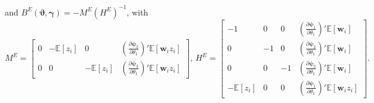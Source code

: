 \begin{lem}
\[\]
and $B^E(\boldsymbol{\vartheta},\boldsymbol{\gamma}) = -M^E (H^E)^{-1}$, with
\[
  M^E = \left[ 
    \begin{array}{cccc} 
      0 & -\mathbb{E}[z_i] & 0 & \left( \frac{\partial \boldsymbol{\psi}_2}{\partial \theta_1} \right)' \mathbb{E}[\mathbf{w}_iz_i]\\ 
      0 & 0 & -\mathbb{E}[z_i] & \left( \frac{\partial \boldsymbol{\psi}_3}{\partial \theta_1} \right)' \mathbb{E}[\mathbf{w}_iz_i] 
  \end{array} \right], \,
H^E = \left[
\begin{array}{cccc}
  -1 & 0 & 0 
  & \left(\frac{\partial \boldsymbol{\psi}_1}{\partial \theta_1}\right)'\mathbb{E}[\mathbf{w}_i]\\
   0 & -1 & 0 &  \left(\frac{\partial \boldsymbol{\psi}_2}{\partial \theta_1}\right)'\mathbb{E}[\mathbf{w}_i]\\
   0 & 0 & -1 & \left(\frac{\partial \boldsymbol{\psi}_3}{\partial \theta_1}\right)'\mathbb{E}[\mathbf{w}_i]\\
   -\mathbb{E}[z_i] & 0 & 0 &  \left(\frac{\partial \boldsymbol{\psi}_1}{\partial \theta_1}\right)'\mathbb{E}[\mathbf{w}_iz_i]
\end{array}
\right].
\]
\label{lem:prelim}
\end{lem}

